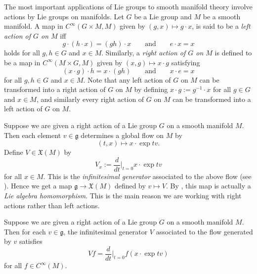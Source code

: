 The most important applications of Lie groups to smooth manifold theory involve actions by Lie groups on manifolds. Let $G$ be a Lie group and $M$ be a smooth manifold. A map in $C^\infty(G \times M,M)$ given by $(g,x) \mapsto g \cdot x$, is said to be a \emph{left action of $G$ on $M$} iff
\begin{equation*}
	g \cdot (h \cdot x) = (gh) \cdot x \qquad \text{and} \qquad e \cdot x = x
\end{equation*}
\noindent holds for all $g,h \in G$ and $x \in M$. Similarly, a \emph{right action of $G$ on $M$} is defined to be a map in $C^\infty(M \times G,M)$ given by $(x,g) \mapsto x \cdot g$ satisfying
\begin{equation*}
	(x \cdot g) \cdot h = x \cdot (gh) \qquad \text{and} \qquad x \cdot e = x
\end{equation*}
\noindent for all $g,h \in G$ and $x \in M$. Note that any left action of $G$ on $M$ can be transformed into a right action of $G$ on $M$ by defining $x \cdot g := g^{-1} \cdot x$ for all $g \in G$ and $x \in M$, and similarly every right action of $G$ on $M$ can  be transformed into a left action of $G$ on $M$. 

Suppose we are given a right action of a Lie group $G$ on a smooth manifold $M$. Then each element $v \in \mathfrak{g}$ determines a global flow on $M$ by
\begin{equation*}
	(t,x) \mapsto x \cdot \exp tv.
\end{equation*}
Define $V \in \mathfrak{X}(M)$ by
\begin{equation*}
	V_x := \frac{d}{dt}\bigg\vert_{t = 0} x \cdot \exp tv
\end{equation*}
\noindent for all $x \in M$. This is the \emph{infinitesimal generator} associated to the above flow (see \cite[210]{lee:smooth_manifolds:2013}). Hence we get a map $\mathfrak{g} \to \mathfrak{X}(M)$ defined by $v \mapsto V$. By \cite[526]{lee:smooth_manifolds:2013}, this map is actually a \emph{Lie algebra homomorphism}. This is the main reason we are working with right actions rather than left actions. 

\begin{proposition}
	Suppose we are given a right action of a Lie group $G$ on a smooth manifold $M$. Then for each $v \in \mathfrak{g}$, the infinitesimal generator $V$ associated to the flow generated by $v$ satisfies
	\begin{equation*}
		Vf = \frac{d}{dt}\bigg\vert_{t = 0} f(x \cdot \exp tv)
	\end{equation*}
	\noindent for all $f \in C^\infty(M)$.
\end{proposition}

